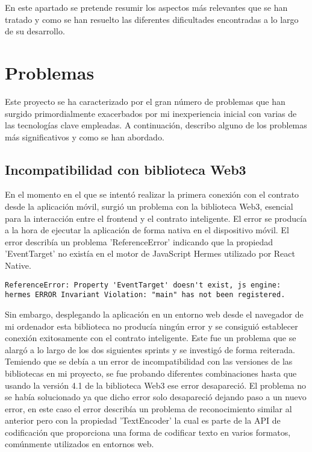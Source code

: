 
En este apartado se pretende resumir los aspectos más relevantes que se han tratado y como se han resuelto las diferentes dificultades encontradas a lo largo de su desarrollo.



\section{Problemas}

Este proyecto se ha caracterizado por el gran número de problemas que han surgido primordialmente exacerbados por mi inexperiencia inicial con varias de las tecnologías clave empleadas.
A continuación, describo alguno de los problemas más significativos y como se han abordado.

\subsection{Incompatibilidad con biblioteca Web3}

En el momento en el que se intentó realizar la primera conexión con el contrato desde la aplicación móvil, surgió un problema con la biblioteca Web3, esencial para la interacción entre el frontend y el contrato inteligente.
El error se producía a la hora de ejecutar la aplicación de forma nativa en el dispositivo móvil.
El error describía un problema 'ReferenceError' indicando que la propiedad 'EventTarget' no existía en el motor de JavaScript Hermes utilizado por React Native. 

\begin{verbatim}
ReferenceError: Property 'EventTarget' doesn't exist, js engine: hermes ERROR Invariant Violation: "main" has not been registered.
\end{verbatim}

Sin embargo, desplegando la aplicación en un entorno web desde el navegador de mi ordenador esta biblioteca no producía ningún error y se consiguió establecer conexión exitosamente con el contrato inteligente.
Este fue un problema que se alargó a lo largo de los dos siguientes sprints y se investigó de forma reiterada. Temiendo que se debía a un error de incompatibilidad con las versiones de las bibliotecas en mi proyecto, se fue probando diferentes combinaciones hasta que usando la versión 4.1 de la biblioteca Web3 ese error desapareció.
El problema no se había solucionado ya que dicho error solo desapareció dejando paso a un nuevo error, en este caso el error describía un problema de reconocimiento similar al anterior pero con la propiedad 'TextEncoder' la cual es parte de la API de codificación que proporciona una forma de codificar texto en varios formatos, comúnmente utilizados en entornos web.

